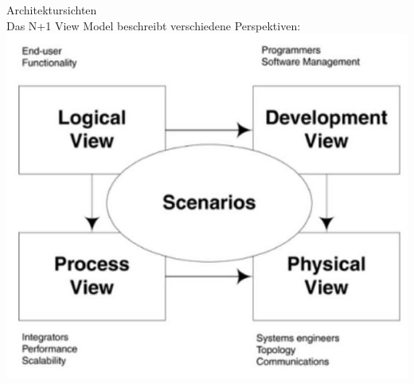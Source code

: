 \begin{concept}{Architektursichten}\\
Das N+1 View Model beschreibt verschiedene Perspektiven:\\
\includegraphics[width=0.9\linewidth]{images/2024_12_29_0d1d7b5551ea1b4b41bdg-09}
\end{concept}

